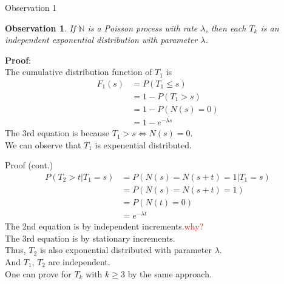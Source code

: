 \documentclass[mathserif]{beamer}
\newtheorem{obs}{Observation}
\begin{document}
\begin{frame}{Observation 1}
\begin{obs}
If $\mathbb{N}$ is a Poisson process with rate $\lambda$,
then each $T_k$ is an independent exponential distribution with parameter $\lambda$.
\end{obs}
\textbf{Proof}:\\
The cumulative distribution function of $T_1$ is
\begin{align*}
F_1(s) & = P(T_1 \leq s) \\
& = 1 - P(T_1 > s) \\
& = 1 - P(N(s) = 0) \\
& = 1 - e^{-\lambda s}
\end{align*}
The 3rd equation is because $T_1 > s \iff N(s) = 0$. \\
We can observe that $T_1$ is expenential distributed.
\end{frame}

\begin{frame}{Proof (cont.)}
\begin{align*}
P(T_2 > t | T_1 = s) & = P(N(s) = N(s+t) = 1 | T_1 = s) \\
& = P(N(s) = N(s+t) = 1) \\
& = P(N(t) = 0) \\
& = e^{-\lambda t}
\end{align*}
The 2nd equation is by independent increments.\textcolor{red}{why?} \\
The 3rd equation is by stationary increments.\\
\vspace{\baselineskip}
Thus, $T_2$ is also exponential distributed with parameter $\lambda$. \\
And $T_1$, $T_2$ are independent. \\
One can prove for $T_k$ with $k \geq 3$ by the same approach.
\end{frame}
\end{document}
